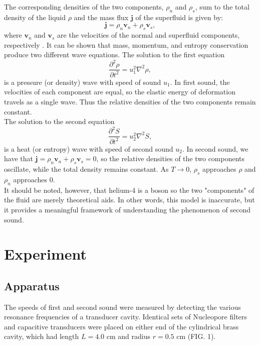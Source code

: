 \documentclass[prb,aps,twocolumn,showpacs,10pt]{revtex4-1}
\begin{document}
The corresponding densities of the two components, $\rho_n$ and $\rho_s$, sum to the total density of the liquid $\rho$ and the mass flux $\mathbf{j}$ of the superfluid is given by:
\begin{equation}
\mathbf{j}=\rho_n \mathbf{v}_n+\rho_s \mathbf{v}_s,
\end{equation}
where $\mathbf{v}_n$ and $\mathbf{v}_s$ are the velocities of the normal and superfluid components, respectively \cite{stanford}. It can be shown that mass, momentum, and entropy conservation produce two different wave equations. The solution to the first equation
\begin{equation}
\frac{\partial^2\rho}{\partial t^2} = u_1^2 \nabla^2 \rho,
\end{equation}
is a pressure (or density) wave with speed of sound $u_1$. In first sound, the velocities of each component are equal, so the elastic energy of deformation travels as a single wave. Thus the relative densities of the two components remain constant.\\

The solution to the second equation
\begin{equation}
\frac{\partial^2S}{\partial t^2} = u_2^2 \nabla^2 S,
\end{equation}
is a heat (or entropy) wave with speed of second sound $u_2$. In second sound, we have that $\mathbf{j}=\rho_n \mathbf{v}_n+\rho_s \mathbf{v}_s=0$, so the relative densities of the two components oscillate, while the total density remains constant\cite{stanford}. As $T\rightarrow 0$, $\rho_s$ approaches $\rho$ and $\rho_n$ approaches 0. \\

It should be noted, however, that helium-4  is a boson so the two "components" of the fluid are merely theoretical aids. In other words, this model is inaccurate, but it provides a meaningful framework of understanding the phenomenon of second sound. \\

\section{Experiment}

\subsection{Apparatus}
The speeds of first and second sound were measured by detecting the various resonance frequencies of a transducer cavity. Identical sets of Nucleopore filters and capacitive transducers were placed on either end of the cylindrical brass cavity, which had length $L=4.0$ cm and radius $r = 0.5$ cm (FIG. 1).\\
\end{document}
